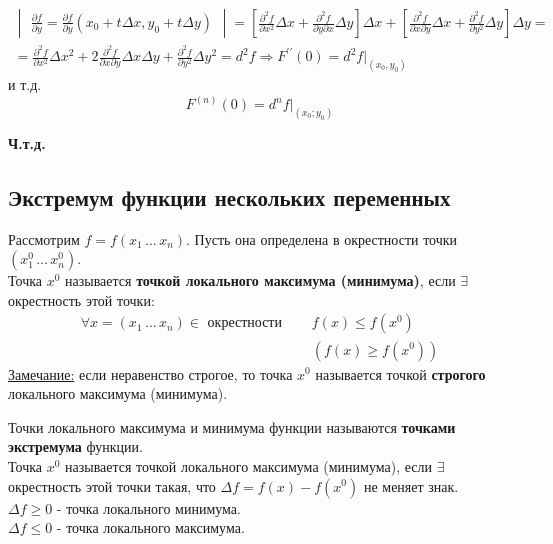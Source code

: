 \documentclass[12pt]{article}
\begin{document}
\begin{adjustwidth}{1.5em}{1.5em}
\begin{gather*}
\begin{vmatrix}
                \frac{\partial f}{\partial y}=\frac{\partial f}{\partial y}\left(x_0+t \Delta x, y_0+t \Delta y\right)
            \end{vmatrix} =\left[\frac{\partial^2 f}{\partial x^2} \Delta x+\frac{\partial^2 f}{\partial y \partial x} \Delta y\right] \Delta x+\left[\frac{\partial^2 f}{\partial x \partial y} \Delta x+\frac{\partial^2 f}{\partial y^2} \Delta y\right] \Delta y \boxed{=}  \\
            \boxed{=} \frac{\partial^2 f}{\partial x^2} \Delta x^2+2 \frac{\partial^2 f}{\partial x \partial y} \Delta x \Delta y+\frac{\partial^2 f}{\partial y^2} \Delta y^2=d^2 f \Rightarrow F^{\prime \prime}(0)=d^2 f \Big|_{(x_0, y_0)}
        \end{gather*}
        и т.д.
        \[ F^{(n)}(0) = d^n f \Big|_{(x_0; y_0)} \]
        \begin{center}
            \textbf{Ч.т.д.}
        \end{center}
    \end{adjustwidth}

    \subsection{Экстремум функции нескольких переменных}
    Рассмотрим $f = f(x_1\, \dots\, x_n)$. Пусть она определена в окрестности точки $(x^0_1\, \dots\, x^0_n)$.\\
    Точка $x^0$ называется \textbf{точкой локального максимума (минимума)}, если $\exists$ окрестность этой точки:
    \begin{align*} 
        \forall x = (x_1\, \dots\, x_n) \in \text{ окрестности } \quad &f(x) \le f(x^0) \\
        &(f(x) \ge f(x^0))
    \end{align*}
    \underline{Замечание:} если неравенство строгое, то точка $x^0$ называется точкой \textbf{строгого} локального максимума (минимума).\par\noindent
    Точки локального максимума и минимума функции называются \textbf{точками экстремума} функции.\\
    Точка $x^0$ называется точкой локального максимума (минимума), если $\exists$ окрестность этой точки такая, что $\Delta f = f(x) - f(x^0)$ не меняет знак.\\
    $\Delta f \ge 0$ - точка локального минимума.\\
    $\Delta f \le 0$ - точка локального максимума.
\end{document}
